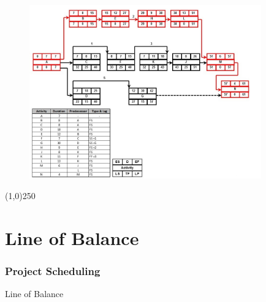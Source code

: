 \begin{frame}
\begin{figure}
	\centering
		\includegraphics[width = 10.0cm]{oldnotes/Slide240.jpg}
\end{figure}
\end{frame}
\begin{center}\line(1,0){250}\end{center}







\section{Line of Balance}



\begin{frame}
	\frametitle{Project Scheduling}
	\begin{block}{Line of Balance}
		
	\end{block}
\end{frame}


